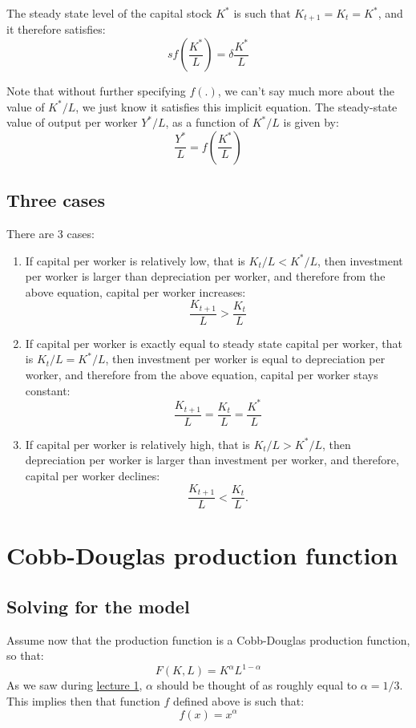 \documentclass[]{book}
\theoremstyle{definition}
\theoremstyle{definition}
\theoremstyle{definition}
\theoremstyle{remark}
\begin{document}
The steady state level of the capital stock \(K^{*}\) is such that
\(K_{t+1}=K_{t}=K^{*}\), and it therefore satisfies:
\[\boxed{sf\left(\frac{K^{*}}{L}\right)=\delta\frac{K^{*}}{L}}\]

Note that without further specifying \(f(.)\), we can't say much more
about the value of \(K^{*}/L\), we just know it satisfies this implicit
equation. The steady-state value of output per worker \(Y^{*}/L\), as a
function of \(K^{*}/L\) is given by:
\[\frac{Y^{*}}{L}=f\left(\frac{K^{*}}{L}\right)\]

\subsection{Three cases}\label{three-cases}

There are 3 cases:

\begin{enumerate}
\def\labelenumi{\arabic{enumi}.}
\item
  If capital per worker is relatively low, that is \(K_{t}/L<K^{*}/L\),
  then investment per worker is larger than depreciation per worker, and
  therefore from the above equation, capital per worker increases:
  \[\frac{K_{t+1}}{L}>\frac{K_{t}}{L}\]
\item
  If capital per worker is exactly equal to steady state capital per
  worker, that is \(K_{t}/L=K^{*}/L\), then investment per worker is
  equal to depreciation per worker, and therefore from the above
  equation, capital per worker stays constant:
  \[\frac{K_{t+1}}{L}=\frac{K_{t}}{L}=\frac{K^{*}}{L}\]
\item
  If capital per worker is relatively high, that is \(K_{t}/L>K^{*}/L\),
  then depreciation per worker is larger than investment per worker, and
  therefore, capital per worker declines:
  \[\frac{K_{t+1}}{L}<\frac{K_{t}}{L}.\]
\end{enumerate}

\hypertarget{cobb}{\section{Cobb-Douglas production
function}\label{cobb}}

\subsection{Solving for the model}\label{solving-for-the-model}

Assume now that the production function is a Cobb-Douglas production
function, so that:\\
\[F(K,L)=K^{\alpha}L^{1-\alpha}\] As we saw during
\protect\hyperlink{intro-cobb}{lecture 1}, \(\alpha\) should be thought
of as roughly equal to \(\alpha = 1/3\). This implies then that function
\(f\) defined above is such that: \[f(x)=x^{\alpha}\]
\end{document}
